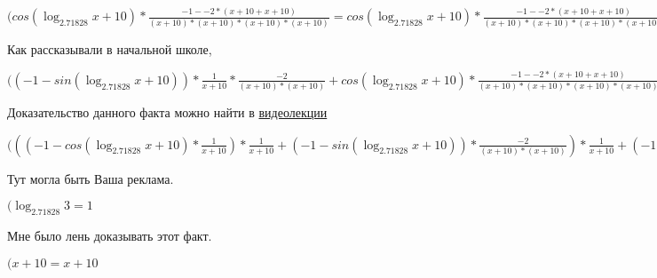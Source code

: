 \documentclass[12pt,a4paper,fleqn]{article}
\theoremstyle{definition}
\begin{document}
$(cos(\log_{ 2.71828 }{ x  +  10 }) * \frac{ -1  -  -2  * ( x  +  10  +  x  +  10 )}{( x  +  10 ) * ( x  +  10 ) * ( x  +  10 ) * ( x  +  10 )}
 = cos(\log_{ 2.71828 }{ x  +  10 }) * \frac{ -1  -  -2  * ( x  +  10  +  x  +  10 )}{( x  +  10 ) * ( x  +  10 ) * ( x  +  10 ) * ( x  +  10 )}
$

Как рассказывали в начальной школе,

$(( -1  - sin(\log_{ 2.71828 }{ x  +  10 })) * \frac{ 1 }{ x  +  10 }
 * \frac{ -2 }{( x  +  10 ) * ( x  +  10 )}
 + cos(\log_{ 2.71828 }{ x  +  10 }) * \frac{ -1  -  -2  * ( x  +  10  +  x  +  10 )}{( x  +  10 ) * ( x  +  10 ) * ( x  +  10 ) * ( x  +  10 )}
 = ( -1  - sin(\log_{ 2.71828 }{ x  +  10 })) * \frac{ 1 }{ x  +  10 }
 * \frac{ -2 }{( x  +  10 ) * ( x  +  10 )}
 + cos(\log_{ 2.71828 }{ x  +  10 }) * \frac{ -1  -  -2  * ( x  +  10  +  x  +  10 )}{( x  +  10 ) * ( x  +  10 ) * ( x  +  10 ) * ( x  +  10 )}
$

Доказательство данного факта можно найти в \href{https://www.youtube.com/watch?v=dQw4w9WgXcQ}{видеолекции}

$((( -1  - cos(\log_{ 2.71828 }{ x  +  10 }) * \frac{ 1 }{ x  +  10 }
) * \frac{ 1 }{ x  +  10 }
 + ( -1  - sin(\log_{ 2.71828 }{ x  +  10 })) * \frac{ -2 }{( x  +  10 ) * ( x  +  10 )}
) * \frac{ 1 }{ x  +  10 }
 + ( -1  - sin(\log_{ 2.71828 }{ x  +  10 })) * \frac{ 1 }{ x  +  10 }
 * \frac{ -2 }{( x  +  10 ) * ( x  +  10 )}
 + ( -1  - sin(\log_{ 2.71828 }{ x  +  10 })) * \frac{ 1 }{ x  +  10 }
 * \frac{ -2 }{( x  +  10 ) * ( x  +  10 )}
 + cos(\log_{ 2.71828 }{ x  +  10 }) * \frac{ -1  -  -2  * ( x  +  10  +  x  +  10 )}{( x  +  10 ) * ( x  +  10 ) * ( x  +  10 ) * ( x  +  10 )}
 = (( -1  - cos(\log_{ 2.71828 }{ x  +  10 }) * \frac{ 1 }{ x  +  10 }
) * \frac{ 1 }{ x  +  10 }
 + ( -1  - sin(\log_{ 2.71828 }{ x  +  10 })) * \frac{ -2 }{( x  +  10 ) * ( x  +  10 )}
) * \frac{ 1 }{ x  +  10 }
 + ( -1  - sin(\log_{ 2.71828 }{ x  +  10 })) * \frac{ 1 }{ x  +  10 }
 * \frac{ -2 }{( x  +  10 ) * ( x  +  10 )}
 + ( -1  - sin(\log_{ 2.71828 }{ x  +  10 })) * \frac{ 1 }{ x  +  10 }
 * \frac{ -2 }{( x  +  10 ) * ( x  +  10 )}
 + cos(\log_{ 2.71828 }{ x  +  10 }) * \frac{ -1  -  -2  * ( x  +  10  +  x  +  10 )}{( x  +  10 ) * ( x  +  10 ) * ( x  +  10 ) * ( x  +  10 )}
$

Тут могла быть Ваша реклама.

$(\log_{ 2.71828 }{ 3 } =  1 $

Мне было лень доказывать этот факт.

$( x  +  10  =  x  +  10 $
\end{document}
